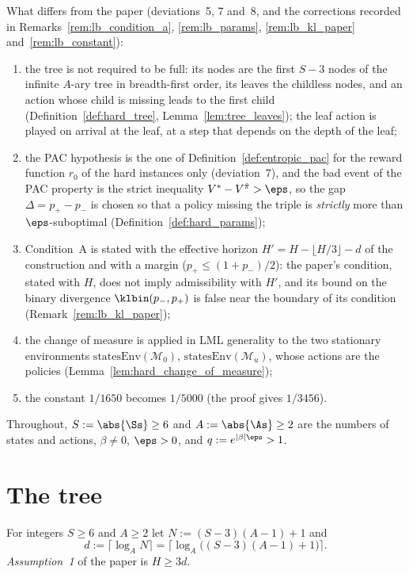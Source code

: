 What differs from the paper (deviations~5, 7 and~8, and the corrections recorded in
Remarks~\ref{rem:lb_condition_a}, \ref{rem:lb_params}, \ref{rem:lb_kl_paper}
and~\ref{rem:lb_constant}):
\begin{enumerate}
  \item[(i)] the tree is not required to be full: its nodes are the first $S - 3$ nodes of the
        infinite $A$-ary tree in breadth-first order, its leaves the childless nodes, and an
        action whose child is missing leads to the first child (Definition~\ref{def:hard_tree},
        Lemma~\ref{lem:tree_leaves}); the leaf action is played on arrival at the leaf, at a step
        that depends on the depth of the leaf;
  \item[(ii)] the PAC hypothesis is the one of Definition~\ref{def:entropic_pac} for the reward
        function $r_0$ of the hard instances only (deviation~7), and the bad event of the PAC
        property is the strict inequality $V^* - V^{\hat\pi} > \eps$, so the gap $\Delta = p_+ - p_-$
        is chosen so that a policy missing the triple is \emph{strictly} more than
        $\eps$-suboptimal (Definition~\ref{def:hard_params});
  \item[(iii)] Condition~A is stated with the effective horizon $H' = H - \lfloor H/3\rfloor - d$
        of the construction and with a margin ($p_+ \le (1 + p_-)/2$): the paper's condition,
        stated with $H$, does not imply admissibility with $H'$, and its bound on the binary
        divergence $\klbin(p_-, p_+)$ is false near the boundary of its condition
        (Remark~\ref{rem:lb_kl_paper});
  \item[(iv)] the change of measure is applied in LML generality to the two stationary
        environments $\mathrm{statesEnv}(\mathcal M_0)$, $\mathrm{statesEnv}(\mathcal M_u)$,
        whose actions are the policies (Lemma~\ref{lem:hard_change_of_measure});
  \item[(v)] the constant $1/1650$ becomes $1/5000$ (the proof gives $1/3456$).
\end{enumerate}
Throughout, $S := \abs{\Ss} \ge 6$ and $A := \abs{\As} \ge 2$ are the numbers of states and
actions, $\beta \ne 0$, $\eps > 0$, and $q := e^{|\beta|\eps} > 1$.

\section{The tree}
\label{sec:lb_tree}

\begin{definition}\label{def:tree_depth}
\leanok
For integers $S \ge 6$ and $A \ge 2$ let $N := (S - 3)(A - 1) + 1$ and
\[
  d := \lceil \log_A N \rceil = \big\lceil \log_A\big((S-3)(A-1) + 1\big)\big\rceil .
\]
\emph{Assumption~1} of the paper is $H \ge 3d$.
\end{definition}

